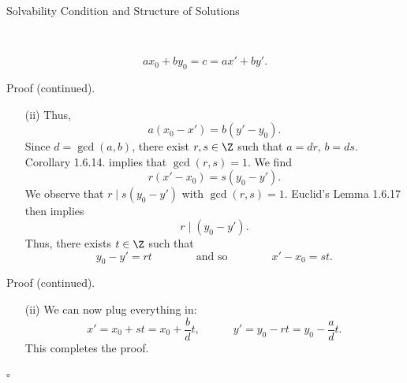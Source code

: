 \documentclass[smaller,hyperref={CJKbookmarks=true}]{beamer}
\newenvironment{PROOF}{{\noindent\!\sf\alert{Proof.}}\\}{\hfill$\square$\\}
\begin{document}
\begin{frame}{Solvability Condition and Structure of Solutions}
\begin{spacing}{1.05}
\begin{PROOF}
\begin{enumerate}[(i)]
      \[ax_0+by_0=c=ax'+by'.\]
\end{enumerate}
\newpage
\alert{Proof (continued).}\\[3pt]
\begin{itemize}
  \item[(ii)] Thus,
  \[a(x_0-x')=b(y'-y_0).\]
  Since $d=\gcd(a,b)$, there exist $r,s\in\Z$ such that $a=dr,\,b=ds$. Corollary 1.6.14. implies that $\gcd(r,s)=1$. We find
  \[r(x'-x_0)=s(y_0-y').\]
  We observe that $r\mid s(y_0-y')$ with $\gcd(r,s)=1$. Euclid's Lemma 1.6.17 then implies
  \[r\mid(y_0-y').\]
  Thus, there exists $t\in\Z$ such that
  \[y_0-y'=rt\qquad\qquad\text{and so}\qquad\qquad x'-x_0=st.\]
\end{itemize}
\newpage
\alert{Proof (continued).}\\[3pt]
\begin{itemize}
  \item[(ii)] We can now plug everything in:
      \[x'=x_0+st=x_0+\frac{b}{d}t,
      \qquad\quad y'=y_0-rt=y_0-\frac{a}{d}t.\]
      This completes the proof.
\end{itemize}
\end{PROOF}
\end{spacing}
\end{frame}
\end{document}

